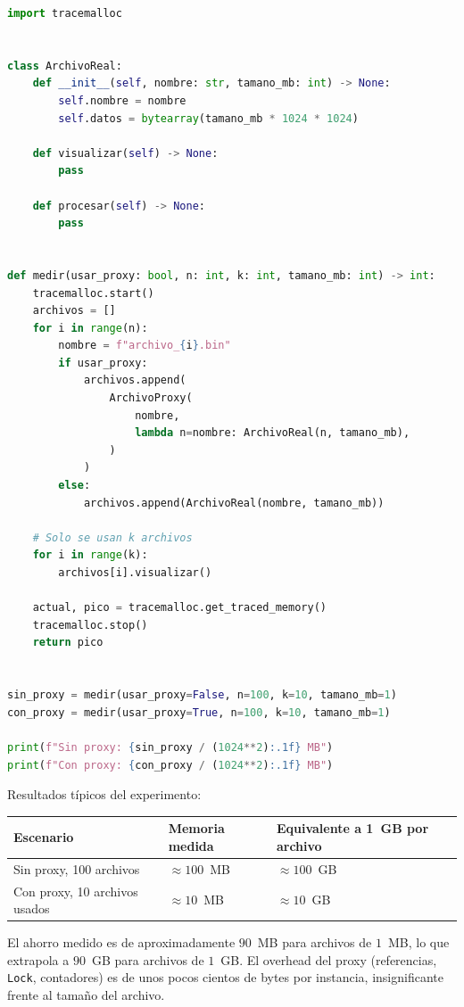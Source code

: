 \begin{lstlisting}[language=Python,caption={Experimento de medición con tracemalloc}]
import tracemalloc


class ArchivoReal:
    def __init__(self, nombre: str, tamano_mb: int) -> None:
        self.nombre = nombre
        self.datos = bytearray(tamano_mb * 1024 * 1024)

    def visualizar(self) -> None:
        pass

    def procesar(self) -> None:
        pass


def medir(usar_proxy: bool, n: int, k: int, tamano_mb: int) -> int:
    tracemalloc.start()
    archivos = []
    for i in range(n):
        nombre = f"archivo_{i}.bin"
        if usar_proxy:
            archivos.append(
                ArchivoProxy(
                    nombre,
                    lambda n=nombre: ArchivoReal(n, tamano_mb),
                )
            )
        else:
            archivos.append(ArchivoReal(nombre, tamano_mb))

    # Solo se usan k archivos
    for i in range(k):
        archivos[i].visualizar()

    actual, pico = tracemalloc.get_traced_memory()
    tracemalloc.stop()
    return pico


sin_proxy = medir(usar_proxy=False, n=100, k=10, tamano_mb=1)
con_proxy = medir(usar_proxy=True, n=100, k=10, tamano_mb=1)

print(f"Sin proxy: {sin_proxy / (1024**2):.1f} MB")
print(f"Con proxy: {con_proxy / (1024**2):.1f} MB")
\end{lstlisting}

Resultados típicos del experimento:

\begin{center}
\begin{tabular}{lll}
\toprule
Escenario & Memoria medida & Equivalente a 1~GB por archivo \\
\midrule
Sin proxy, 100 archivos & \(\approx 100\)~MB & \(\approx 100\)~GB \\
Con proxy, 10 archivos usados & \(\approx 10\)~MB & \(\approx 10\)~GB \\
\bottomrule
\end{tabular}
\end{center}

El ahorro medido es de aproximadamente \(90\)~MB para archivos de \(1\)~MB, lo que extrapola a \(90\)~GB para archivos de \(1\)~GB. El overhead del proxy (referencias, \texttt{Lock}, contadores) es de unos pocos cientos de bytes por instancia, insignificante frente al tamaño del archivo.

